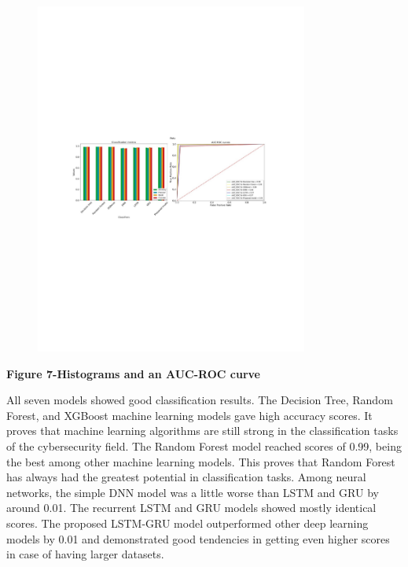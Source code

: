 \begin{figure}[H]
	\centering
	\includegraphics[width=0.8\textwidth]{media/ict/image85}
	\caption*{}
\end{figure}


{\bfseries Figure 7-Histograms and an AUC-ROC curve}

All seven models showed good classification results. The Decision Tree,
Random Forest, and XGBoost machine learning models gave high accuracy
scores. It proves that machine learning algorithms are still strong in
the classification tasks of the cybersecurity field. The Random Forest
model reached scores of 0.99, being the best among other machine
learning models. This proves that Random Forest has always had the
greatest potential in classification tasks. Among neural networks, the
simple DNN model was a little worse than LSTM and GRU by around 0.01.
The recurrent LSTM and GRU models showed mostly identical scores. The
proposed LSTM-GRU model outperformed other deep learning models by 0.01
and demonstrated good tendencies in getting even higher scores in case
of having larger datasets.

